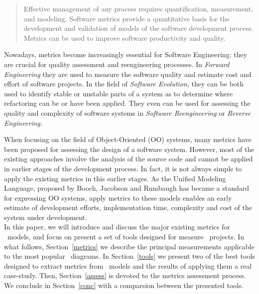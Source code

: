 \begin{quotation}
Effective management of any process requires quantification, measurement, and modeling.
Software metrics provide a quantitative basis for the development and validation of models of the software development process.
Metrics can be used to improve software productivity and quality\cite{g1:Millis:1998}.
\end{quotation}
    
Nowadays, metrics become increasingly essential for Software Engineering: they are crucial for quality assessment and reengineering processes.
In \emph{Forward Engineering} they are used to measure the software quality and estimate cost and effort of software projects\cite{Fenton}.
In the field of \emph{Software Evolution}, they can be both used to identify stable or unstable parts of a system as to determine where refactoring can be or have been applied\cite{Serge}.
They even can be used for assessing the quality and complexity of software systems in \emph{Software Reengineering} or \emph{Reverse Engineering}\cite{43044}.

When focusing on the field of Object-Oriented (OO) systems, many metrics have been proposed for assessing the design of a software system.
However, most of the existing approaches involve the analysis of the source code and cannot be applied in earlier stages of the development process.
In fact, it is not always simple to apply the existing metrics in this earlier stages. 
As the \textsf{Unified Modeling Language}, proposed by Booch, Jacobson and Rumbaugh\cite{USDPuml} has became a standard for expressing OO systems, apply metrics to these models enables an early estimate of development efforts, implementation time, complexity and cost of the system under development. \\

In this paper, we will introduce and discuss the major existing metrics for \umlS~models, and focus on present a set of tools designed for measure \umlS~projects.
In what follows, Section~\ref{metrics} we describe the principal measurements applicable to the most popular \umlS~diagrams.
In Section~\ref{tools} we present two of the best tools designed to extract metrics from \umlS~models and the results of applying them a real case-study.
Then, Section~\ref{assess} is devoted to the metrics assessment process.
We conclude in Section~\ref{conc} with a comparsion between the presented tools.

